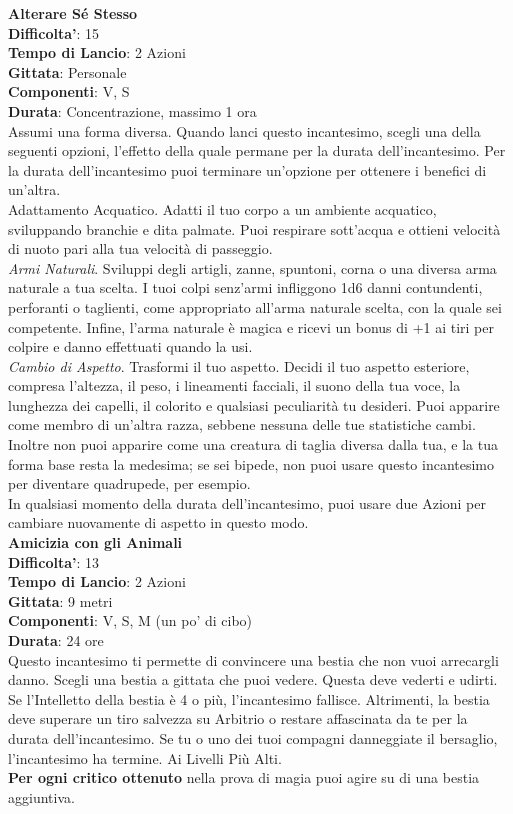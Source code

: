 \begin{multicols}{2}
\medskip\textbf{Alterare Sé Stesso}\\
\textbf{Difficolta'}: 15\\
\textbf{Tempo di Lancio}: 2 Azioni\\
\textbf{Gittata}: Personale\\
\textbf{Componenti}: V, S\\
\textbf{Durata}: Concentrazione, massimo 1 ora\\
Assumi una forma diversa. Quando lanci questo incantesimo, scegli una della seguenti opzioni, l’effetto della quale permane per la durata dell’incantesimo. Per  la durata dell’incantesimo puoi terminare un’opzione per ottenere i benefici di un’altra.\\
Adattamento Acquatico. Adatti il tuo corpo a un ambiente acquatico, sviluppando branchie e dita palmate. Puoi respirare sott’acqua e ottieni velocità di nuoto pari alla tua velocità di passeggio.\\
\textit{Armi Naturali}. Sviluppi degli artigli, zanne, spuntoni, corna o una diversa arma naturale a tua scelta. I tuoi colpi senz’armi infliggono 1d6 danni contundenti, perforanti o taglienti, come appropriato all’arma naturale scelta, con la quale sei competente. Infine, l’arma naturale è magica e ricevi un bonus di +1 ai tiri per colpire e danno effettuati quando la usi.\\
\textit{Cambio di Aspetto}. Trasformi il tuo aspetto. Decidi il tuo aspetto esteriore, compresa l’altezza, il peso, i lineamenti facciali, il suono della tua voce, la lunghezza dei capelli, il colorito e qualsiasi peculiarità tu desideri. Puoi apparire come membro di un’altra razza, sebbene nessuna delle tue statistiche cambi. Inoltre non puoi apparire come una creatura di taglia diversa dalla tua, e la tua forma base resta la medesima; se sei bipede, non puoi usare questo incantesimo per diventare quadrupede, per esempio.\\
In qualsiasi momento della durata dell’incantesimo, puoi usare due Azioni per cambiare nuovamente di aspetto in questo modo.\\

\medskip\textbf{Amicizia con gli Animali}\\
\textbf{Difficolta'}: 13\\
\textbf{Tempo di Lancio}: 2 Azioni\\
\textbf{Gittata}: 9 metri\\
\textbf{Componenti}: V, S, M (un po’ di cibo)\\
\textbf{Durata}: 24 ore\\
Questo incantesimo ti permette di convincere una bestia che non vuoi arrecargli danno. Scegli una bestia a gittata che puoi vedere. Questa deve vederti e udirti. Se l’Intelletto della bestia è 4 o più, l’incantesimo fallisce. Altrimenti, la bestia deve superare un tiro salvezza su Arbitrio o restare affascinata da te per la durata dell’incantesimo. Se tu o uno dei tuoi compagni danneggiate il bersaglio, l’incantesimo ha termine. Ai Livelli Più Alti.\\
\textbf{Per ogni critico ottenuto} nella prova di magia puoi agire su di una bestia aggiuntiva. 


\end{multicols}

